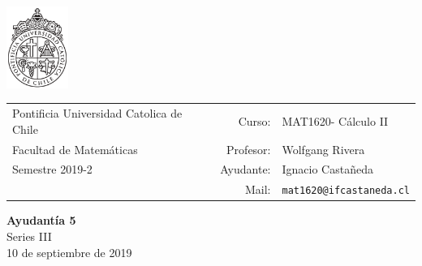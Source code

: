 \documentclass[12pt]{article}
\makeatletter
\newcommand{\ayudantia}{{\sc Ayudantía 5}}
\newcommand{\tituloayu}{Series III}
\newcommand{\fecha}{10 de septiembre de 2019}
\newcommand{\sigla}{MAT1620}
\newcommand{\nombre}{Cálculo II}
\newcommand{\profesor}{Wolfgang Rivera}
\newcommand{\ano}{2019}
\newcommand{\semestre}{2}
\newcommand{\mail}{mat1620@ifcastaneda.cl}
\makeatother
\begin{document}
\thispagestyle{empty}

\begin{minipage}{2cm}
	\includegraphics[width=2cm]{../../../../img/logo.pdf}
	\vspace{0.5cm}
\end{minipage}
\begin{minipage}{\linewidth}
	\begin{tabular}{lrl}
		{\scriptsize\sc Pontificia Universidad Catolica de Chile} & \hspace*{0.7in}Curso: &
		\sigla  - \nombre\\
		{\sc Facultad de Matemáticas}&
		Profesor: & \profesor \\
		{\sc Semestre \ano-\semestre} & Ayudante: & {Ignacio Castañeda}\\
		& {Mail:} & \texttt{\mail}
	\end{tabular}
\end{minipage}

\vspace{-10mm}
\begin{center}
	{\LARGE\bf \ayudantia}\\
	\vspace{0.1cm}
	{\tituloayu}\\
	\vspace{0.1cm}
	\fecha\\
	\vspace{0.4cm}
\end{center}
\end{document}
